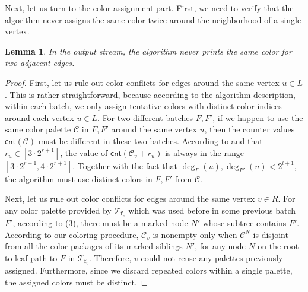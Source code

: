 \documentclass[11pt,a4paper]{article}
\newtheorem{lemma}{Lemma}[section]
\newcommand{\tree}{\mathcal{T}}
\newcommand{\freq}{\mathbf{f}}
\newcommand{\clr}{\mathcal{C}}
\newcommand{\cnt}{\mathsf{cnt}}
\begin{document}
Next, let us turn to the color assignment part. First, we need to verify that the algorithm never assigns the same color twice around the neighborhood of a single vertex.
\begin{lemma}
	In the output stream, the algorithm never prints the same color for two adjacent edges.
\end{lemma}
\begin{proof}
	First, let us rule out color conflicts for edges around the same vertex $u\in L$. This is rather straightforward, because according to the algorithm description, within each batch, we only assign tentative colors with distinct color indices around each vertex $u\in L$. For two different batches $F, F'$, if we happen to use the same color palette $\clr$ in $F, F'$ around the same vertex $u$, then the counter values $\cnt(\clr)$ must be different in these two batches. According to  and that $r_u\in [3\cdot 2^{r+1}]$, the value of $\cnt(\clr_v+r_u)$ is always in the range $[3\cdot 2^{r+1}, 4\cdot 2^{r+1}]$. Together with the fact that $\deg_F(u), \deg_{F'}(u) < 2^{l+1}$, the algorithm must use distinct colors in $F, F'$ from $\clr$.
	
	Next, let us rule out color conflicts for edges around the same vertex $v\in R$. For any color palette provided by $\tree_{\freq_v}$ which was used before in some previous batch $F'$, according to (3), there must be a marked node $N'$ whose subtree contains $F'$. According to our coloring procedure, $\clr_v$ is nonempty only when $\clr^{N}$ is disjoint from all the color packages of its marked siblings $N'$, for any node $N$ on the root-to-leaf path to $F$ in $\tree_{\freq_v}$. Therefore, $v$ could not reuse any  palettes previously assigned. Furthermore, since we discard repeated colors within a single palette, the assigned colors must be distinct.
\end{proof}
\end{document}
